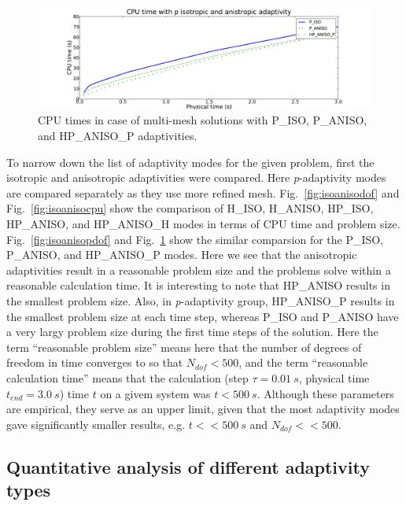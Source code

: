 \begin{figure}
  \begin{centering}
  \includegraphics[width=\columnwidth]{isoanisop_cpu}
  \caption{\label{fig:isoanisopcpu} CPU times in case 
  of multi-mesh solutions with P\_ISO, P\_ANISO, and
  HP\_ANISO\_P adaptivities.}
  \end{centering}
\end{figure}
To narrow down the list of adaptivity modes for the given problem, first the
isotropic and anisotropic adaptivities were compared. Here \emph{p}-adaptivity
modes are compared separately as they use more refined mesh.
Fig.~\ref{fig:isoanisodof} and Fig.~\ref{fig:isoanisocpu} show the comparison
of H\_ISO, H\_ANISO, HP\_ISO, HP\_ANISO, and HP\_ANISO\_H modes in terms of CPU time
and problem size.
Fig.~\ref{fig:isoanisopdof} and Fig.~\ref{fig:isoanisopcpu} show the similar
comparsion for the P\_ISO, P\_ANISO, and HP\_ANISO\_P modes.
Here we see that the anisotropic adaptivities result in a reasonable problem
size and the problems solve within a reasonable calculation time. It is interesting
to note that HP\_ANISO results in the smallest problem size. Also, in
\emph{p}-adaptivity group, HP\_ANISO\_P results in the smallest problem size
at each time step, whereas P\_ISO and P\_ANISO have a very largy problem size
during the first time steps of the solution.
Here the term ``reasonable problem size''
means here that the number of degrees of freedom in time converges
to so that $N_{dof}<500$, and the term ``reasonable calculation time''
means that the calculation (step $\tau=0.01\ s$, physical
time $t_{end}=3.0\ s$) time $t$ on a givem system was $t<500\ s$.
Although these parameters are empirical, they serve as an upper limit, given
that the most adaptivity modes gave significantly smaller results,
e.g. $t<<500\ s$ and $N_{dof} << 500$.

\subsection{Quantitative analysis of different adaptivity types}

